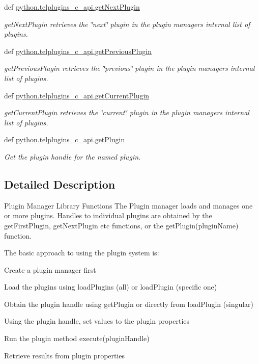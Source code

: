 \begin{DoxyCompactItemize}
def \hyperlink{group__plugin__manager_ga66223ee14260ae683f77095b1d494ffc}{python.\-telplugins\-\_\-c\-\_\-api.\-get\-Next\-Plugin}
\begin{DoxyCompactList}\small\item\em get\-Next\-Plugin retrieves the \char`\"{}next\char`\"{} plugin in the plugin managers internal list of plugins. \end{DoxyCompactList}\item 
def \hyperlink{group__plugin__manager_ga7c063620355e3880de56a303ee05237e}{python.\-telplugins\-\_\-c\-\_\-api.\-get\-Previous\-Plugin}
\begin{DoxyCompactList}\small\item\em get\-Previous\-Plugin retrieves the \char`\"{}previous\char`\"{} plugin in the plugin managers internal list of plugins. \end{DoxyCompactList}\item 
def \hyperlink{group__plugin__manager_gaf426e48ea275db07a74e28cb9a7e3595}{python.\-telplugins\-\_\-c\-\_\-api.\-get\-Current\-Plugin}
\begin{DoxyCompactList}\small\item\em get\-Current\-Plugin retrieves the \char`\"{}current\char`\"{} plugin in the plugin managers internal list of plugins. \end{DoxyCompactList}\item 
def \hyperlink{group__plugin__manager_ga004052ef028b3346ee199d887126623e}{python.\-telplugins\-\_\-c\-\_\-api.\-get\-Plugin}
\begin{DoxyCompactList}\small\item\em Get the plugin handle for the named plugin. \end{DoxyCompactList}\end{DoxyCompactItemize}


\subsection{Detailed Description}
Plugin Manager Library Functions The Plugin manager loads and manages one or more plugins. Handles to individual plugins are obtained by the get\-First\-Plugin, get\-Next\-Plugin etc functions, or the get\-Plugin(plugin\-Name) function.

The basic approach to using the plugin system is\-:
\begin{DoxyEnumerate}
\item Create a plugin manager first
\item Load the plugins using load\-Plugins (all) or load\-Plugin (specific one)
\item Obtain the plugin handle using get\-Plugin or directly from load\-Plugin (singular)
\item Using the plugin handle, set values to the plugin properties
\item Run the plugin method execute(plugin\-Handle)
\item Retrieve results from plugin properties 
\end{DoxyEnumerate}

